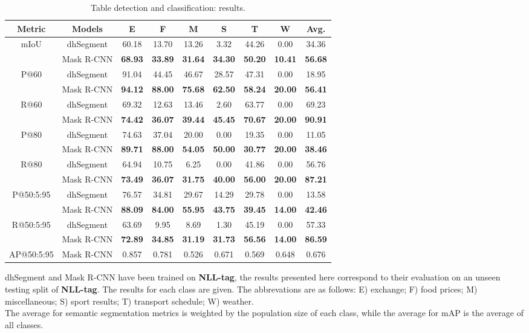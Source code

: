 \begin{table}[htp]
\begin{center}
\begin{tabular}{cc|cccccc|c}
Metric & Models & E & F & M & S & T & W & Avg. \\
\hline
mIoU & dhSegment & 60.18 & 13.70 & 13.26 & 3.32 & 44.26 & 0.00 & 34.36 \\
 & Mask R-CNN & \textbf{68.93} & \textbf{33.89} & \textbf{31.64} & \textbf{34.30} & \textbf{50.20} & \textbf{10.41} & \textbf{56.68}\\
 \hline
P@60 & dhSegment  & 91.04 & 44.45 & 46.67 & 28.57 & 47.31 & 0.00 & 18.95 \\
 & Mask R-CNN  & \textbf{94.12} & \textbf{88.00} & \textbf{75.68} & \textbf{62.50} & \textbf{58.24} & \textbf{20.00} & \textbf{56.41}\\
  \hline
R@60 & dhSegment & 69.32 & 12.63 & 13.46 & 2.60 & 63.77 & 0.00 & 69.23 \\
 & Mask R-CNN  & \textbf{74.42} & \textbf{36.07} & \textbf{39.44} & \textbf{45.45} & \textbf{70.67} & \textbf{20.00} & \textbf{90.91}\\
  \hline
P@80 & dhSegment  & 74.63 & 37.04 & 20.00 & 0.00 & 19.35 & 0.00 & 11.05\\
 & Mask R-CNN  & \textbf{89.71} & \textbf{88.00} & \textbf{54.05} & \textbf{50.00} & \textbf{30.77} & \textbf{20.00} & \textbf{38.46}\\
 \hline
R@80 & dhSegment & 64.94 & 10.75 & 6.25 & 0.00 & 41.86 & 0.00 & 56.76 \\
 & Mask R-CNN & \textbf{73.49} & \textbf{36.07} & \textbf{31.75} & \textbf{40.00} & \textbf{56.00} & \textbf{20.00} & \textbf{87.21} \\
 \hline
P@50:5:95 & dhSegment & 76.57 & 34.81 & 29.67 & 14.29 & 29.78 & 0.00 & 13.58\\
 & Mask R-CNN & \textbf{88.09} & \textbf{84.00} & \textbf{55.95} & \textbf{43.75} & \textbf{39.45} & \textbf{14.00} & \textbf{42.46}\\
 \hline
R@50:5:95 & dhSegment & 63.69 & 9.95 & 8.69 & 1.30 & 45.19 & 0.00 & 57.33\\
 & Mask R-CNN & \textbf{72.89} & \textbf{34.85} & \textbf{31.19} & \textbf{31.73} & \textbf{56.56} & \textbf{14.00} & \textbf{86.59}\\
 \hline
  \hline
 AP@50:5:95 & Mask R-CNN & 0.857 & 0.781 & 0.526 & 0.671 & 0.569 & 0.648 & 0.676 \\
  \hline
\end{tabular}
\end{center}
\caption{Table detection and classification: results.}
\medskip
\small
dhSegment and Mask R-CNN have been trained on \textbf{NLL-tag}, the results presented here correspond to their evaluation on an unseen testing split of \textbf{NLL-tag}. The results for each class are given. The abbrevations are as follows: E) exchange; F) food prices; M) miscellaneous; S) sport results; T) transport schedule; W) weather. \\
The average for semantic segmentation metrics is weighted by the population size of each class, while the average for mAP is the average of all classes.
\label{final_setup_results}
\end{table}%